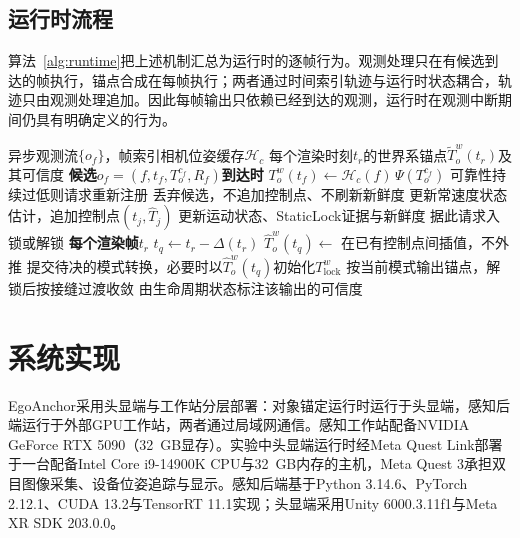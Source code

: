 \documentclass[review]{vgtc}
\begin{document}
\subsection{运行时流程}\label{sec:runtime-alg}

算法~\ref{alg:runtime}把上述机制汇总为运行时的逐帧行为。观测处理只在有候选到达的帧执行，锚点合成在每帧执行；两者通过时间索引轨迹与运行时状态耦合，轨迹只由观测处理追加。因此每帧输出只依赖已经到达的观测，运行时在观测中断期间仍具有明确定义的行为。

\begin{algorithm}[t]
\caption{锚定运行时}
\label{alg:runtime}
\small
\begin{algorithmic}[1]
\Require 异步观测流$\{o_f\}$，帧索引相机位姿缓存$\mathcal{H}_c$
\Ensure 每个渲染时刻$t_r$的世界系锚点$\widetilde{T}_o^w(t_r)$及其可信度
\Statex \textbf{候选$o_f = (f, t_f, T_o^{c_f}, R_f)$到达时}
\State $T_o^w(t_f) \gets \mathcal{H}_c(f)\,\Psi(T_o^{c_f})$ 
\State 可靠性持续过低则请求重新注册
  \State 丢弃候选，不追加控制点、不刷新新鲜度
\Else
  \State 更新常速度状态估计，追加控制点$(t_j, \widehat{T}_j)$
  \State 更新运动状态、StaticLock证据与新鲜度 
  \State 据此请求入锁或解锁
\EndIf
\Statex \textbf{每个渲染帧$t_r$}
\State $t_q \gets t_r - \Delta(t_r)$ 
\State $\widehat{T}_o^w(t_q) \gets$ 在已有控制点间插值，不外推 
\State 提交待决的模式转换，必要时以$\widehat{T}_o^w(t_q)$初始化$T_{\mathrm{lock}}^w$
\State 按当前模式输出锚点，解锁后按接缝过渡收敛 
\State 由生命周期状态标注该输出的可信度
\end{algorithmic}
\end{algorithm}

\section{系统实现}\label{sec:implementation}

EgoAnchor采用头显端与工作站分层部署：对象锚定运行时运行于头显端，感知后端运行于外部GPU工作站，两者通过局域网通信。感知工作站配备NVIDIA GeForce RTX 5090（32~GB显存）。实验中头显端运行时经Meta Quest Link部署于一台配备Intel Core i9-14900K CPU与32~GB内存的主机，Meta Quest 3承担双目图像采集、设备位姿追踪与显示。感知后端基于Python 3.14.6、PyTorch 2.12.1、CUDA 13.2与TensorRT 11.1实现；头显端采用Unity 6000.3.11f1与Meta XR SDK 203.0.0。
\end{document}
